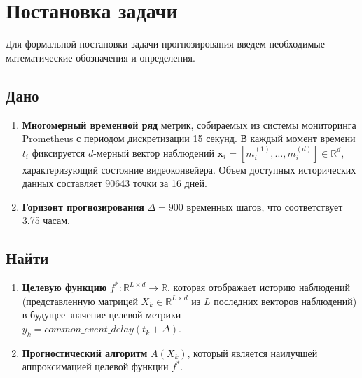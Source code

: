 \section{Постановка задачи}

\hspace*{1.25cm}Для формальной постановки задачи прогнозирования введем необходимые математические обозначения и определения.

\subsection*{Дано}
\begin{enumerate}
	\item \textbf{Многомерный временной ряд} метрик, собираемых из системы мониторинга Prometheus с периодом дискретизации 15 секунд. В каждый момент времени $t_i$ фиксируется $d$-мерный вектор наблюдений $\mathbf{x}_i = [m^{(1)}_i, \dots, m^{(d)}_i] \in \mathbb{R}^d$, характеризующий состояние видеоконвейера. Объем доступных исторических данных составляет 90643 точки за 16 дней.
	\item \textbf{Горизонт прогнозирования} $\Delta = 900$ временных шагов, что соответствует 3.75 часам.
\end{enumerate}

\subsection*{Найти}
\begin{enumerate}
	\item \textbf{Целевую функцию} $f^*: \mathbb{R}^{L \times d} \to \mathbb{R}$, которая отображает историю наблюдений (представленную матрицей $X_k \in \mathbb{R}^{L \times d}$ из $L$ последних векторов наблюдений) в будущее значение целевой метрики \\
	$y_k = common\_event\_delay(t_k + \Delta)$.
	\item \textbf{Прогностический алгоритм} $A(X_k)$, который является наилучшей аппроксимацией целевой функции $f^*$.
\end{enumerate}

